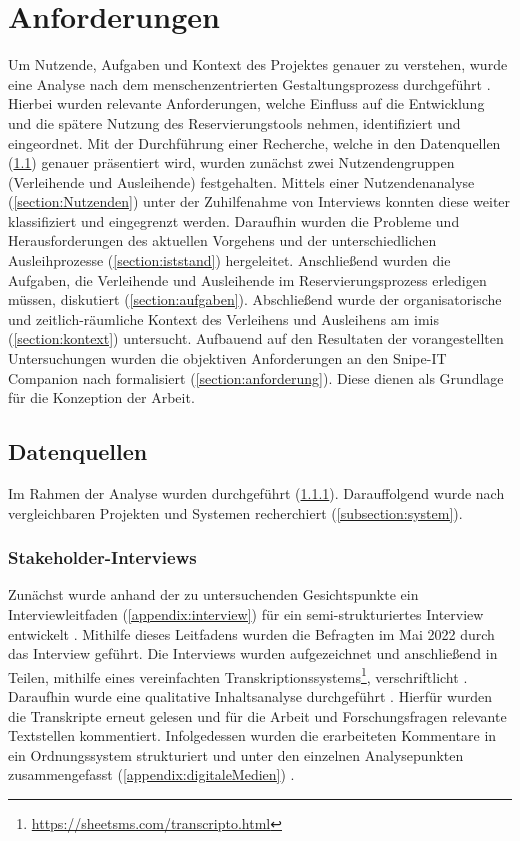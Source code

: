 \chapter{Anforderungen}
\label{chapter-analyse}

Um Nutzende, Aufgaben und Kontext des Projektes genauer zu verstehen, wurde eine Analyse nach dem
menschenzentrierten Gestaltungsprozess durchgeführt \cite{DINISO9241}. Hierbei wurden relevante
Anforderungen, welche Einfluss auf die Entwicklung und die spätere Nutzung des Reservierungstools
nehmen, identifiziert und eingeordnet. Mit der Durchführung einer Recherche, welche in den
Datenquellen (\ref{section:daten}) genauer präsentiert wird, wurden zunächst zwei Nutzendengruppen
(Verleihende und Ausleihende) festgehalten. Mittels einer Nutzendenanalyse (\ref{section:Nutzenden})
unter der Zuhilfenahme von Interviews konnten diese weiter klassifiziert und eingegrenzt werden.
Daraufhin wurden die Probleme und Herausforderungen des aktuellen Vorgehens und der
unterschiedlichen Ausleihprozesse (\ref{section:iststand}) hergeleitet. Anschließend wurden die
Aufgaben, die Verleihende und Ausleihende im Reservierungsprozess erledigen müssen, diskutiert
(\ref{section:aufgaben}). Abschließend wurde der organisatorische und zeitlich-räumliche Kontext des
Verleihens und Ausleihens am \ac{imis} (\ref{section:kontext}) untersucht. Aufbauend auf den
Resultaten der vorangestellten Untersuchungen wurden die objektiven Anforderungen an den Snipe-IT
Companion nach  formalisiert (\ref{section:anforderung}). Diese dienen als
Grundlage für die Konzeption der Arbeit.

\section{Datenquellen}
\label{section:daten}
Im Rahmen der Analyse wurden  durchgeführt
(\ref{subsection:interview}). Darauffolgend wurde nach vergleichbaren Projekten
und Systemen recherchiert (\ref{subsection:system}).

\subsection{Stakeholder-Interviews}
\label{subsection:interview}
Zunächst wurde anhand der zu untersuchenden Gesichtspunkte ein Interviewleitfaden
(\ref{appendix:interview}) für ein semi-strukturiertes Interview entwickelt
\cite{blandford_qualitative_2016}. Mithilfe dieses Leitfadens wurden die Befragten im Mai 2022 durch
das Interview geführt. Die Interviews wurden aufgezeichnet und anschließend in Teilen, mithilfe
eines vereinfachten Transkriptionssystems\footnote{\url{https://sheetsms.com/transcripto.html}},
verschriftlicht \cite{dresing_praxisbuch_2016}. Daraufhin wurde eine qualitative Inhaltsanalyse
durchgeführt \cite{dresing_praxisbuch_2016}. Hierfür wurden die Transkripte erneut gelesen und für
die Arbeit und Forschungsfragen relevante Textstellen kommentiert. Infolgedessen wurden die
erarbeiteten Kommentare in ein Ordnungssystem strukturiert und unter den einzelnen Analysepunkten
zusammengefasst (\ref{appendix:digitaleMedien}) \cite{dresing_praxisbuch_2016}.


